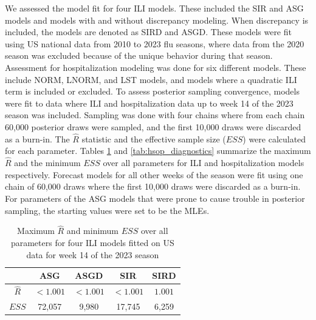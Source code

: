 We assessed the model fit for four ILI models. These included the SIR and 
ASG models and models with and without discrepancy modeling. When discrepancy 
is included, the models are denoted as SIRD and ASGD. These models were fit 
using US national data from 2010 to 2023 flu seasons, where data from the 
2020 season was excluded because of the unique behavior during that season. 
Assessment for hospitalization modeling was done for six different models. 
These include NORM, LNORM, and LST models, and models where a quadratic ILI 
term is included or excluded. To assess posterior sampling convergence, models 
were fit to data where ILI and hospitalization data up to week 14 of the 2023 
season was included. Sampling was done with four chains where from each chain 
60,000 posterior draws were sampled, and the first 10,000 draws were discarded 
as a burn-in. The $\hat{R}$ statistic \cite[]{vehtari2021rank} and the 
effective sample size ($ESS$) \cite[]{gelman2013bayesian} were calculated for 
each parameter. Tables \ref{tab:ili_diagnostics} and 
\ref{tab:hsop_diagnostics} summarize the maximum $\hat{R}$ and the minimum 
$ESS$ over all parameters for ILI and hospitalization models respectively. 
Forecast models for all other weeks of the season were fit using one chain of 
60,000 draws where the first 10,000 draws were discarded as a burn-in. 
For parameters of the ASG models that were prone to cause trouble in posterior 
sampling, the starting values were set to be the MLEs. 

\begin{table}
\caption{Maximum $\hat{R}$ and minimum $ESS$ over all parameters for four ILI 
models fitted on US data for week 14 of the 2023 season}
\label{tab:ili_diagnostics}
\begin{center}
    \begin{tabular}{c|cccc}
     & ASG & ASGD & SIR & SIRD \\
     \hline
     $\hat{R}$ & $< 1.001$ & $< 1.001$ & $< 1.001$ & $1.001$ \\
     $ESS$ & 72,057 & 9,980 & 17,745 & 6,259 \\
    \end{tabular}
    \end{center}
\end{table}


